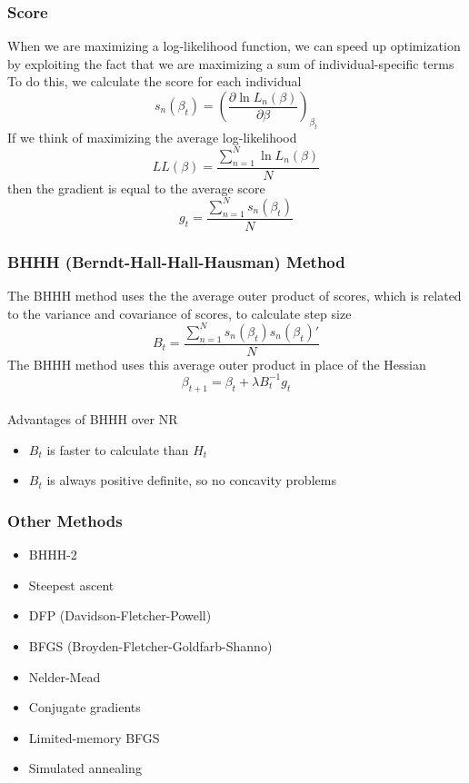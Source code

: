 \documentclass{beamer}
\begin{document}
\begin{frame}\frametitle{Score}
    When we are maximizing a log-likelihood function, we can speed up optimization by exploiting the fact that we are maximizing a sum of individual-specific terms \\
    \vspace{2ex}
    To do this, we calculate the score for each individual
    $$s_n(\beta_t) = \left( \frac{\partial \ln L_n(\beta)}{\partial \beta} \right)_{\beta_t}$$
    If we think of maximizing the average log-likelihood
    $$LL(\beta) = \frac{\sum_{n = 1}^N \ln L_n(\beta)}{N}$$
    then the gradient is equal to the average score
    $$g_t = \frac{\sum_{n = 1}^N s_n(\beta_t)}{N}$$
\end{frame}

\begin{frame}\frametitle{BHHH (Berndt-Hall-Hall-Hausman) Method}
    The BHHH method uses the the average outer product of scores, which is related to the variance and covariance of scores, to calculate step size
    $$B_t = \frac{\sum_{n = 1}^N s_n(\beta_t) s_n(\beta_t)'}{N}$$
    The BHHH method uses this average outer product in place of the Hessian
    $$\beta_{t + 1} = \beta_t + \lambda B_t^{-1} g_t$$ \\
    \vspace{2ex}
    Advantages of BHHH over NR
    \begin{itemize}
        \item $B_t$ is faster to calculate than $H_t$
        \item $B_t$ is always positive definite, so no concavity problems
    \end{itemize}
\end{frame}

\begin{frame}\frametitle{Other Methods}
    \begin{itemize}
        \item BHHH-2
        \item Steepest ascent
        \item DFP (Davidson-Fletcher-Powell)
        \item BFGS (Broyden-Fletcher-Goldfarb-Shanno)
        \item Nelder-Mead
        \item Conjugate gradients
        \item Limited-memory BFGS
        \item Simulated annealing
    \end{itemize}
\end{frame}
\end{document}
